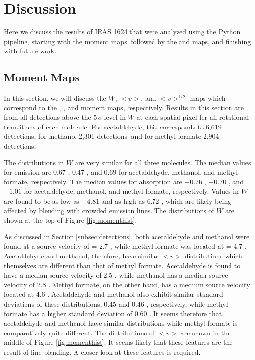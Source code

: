 \documentclass[iop,twocolappendix]{emulateapj}
\begin{document}
\section{Discussion}
\label{sec:discussion}

Here we discuss the results of IRAS 1624 that were analyzed using the Python pipeline, starting with the moment maps, followed by the {\Ntot} and {\Trot} maps, and finishing with future work. 

\subsection{Moment Maps}
\label{subsec:mommaps}

In this section, we will discuss the $W$, $<v>$, and $<v>^{1/2}$ maps which correspond to the {\momzero}, {\momone}, and {\momtwo} moment maps, respectively. Results in this section are from all detections above the 5\,$\sigma$ level in $W$ at each spatial pixel for all rotational transitions of each molecule. For acetaldehyde, this corresponds to 6,619 detections, for methanol 2,301 detections, and for methyl formate 2,904 detections. 

The distributions in $W$ are very similar for all three molecules. The median values for emission are 0.67 {\Jybeamkms}, 0.47 {\Jybeamkms}, and 0.69 {\Jybeamkms} for acetaldehyde, methanol, and methyl formate, respectively. The median values for absorption are $-0.76$ {\Jybeamkms}, $-0.70$ {\Jybeamkms}, and $-1.01$ {\Jybeamkms} for acetaldehyde, methanol, and methyl formate, respectively. Values in $W$ are found to be as low as $-4.81$ {\Jybeamkms} and as high as 6.72 {\Jybeamkms}, which are likely being affected by blending with crowded emission lines. The distributions of $W$ are shown at the top of Figure \ref{fig:momenthist}. 

As discussed in Section \ref{subsec:detections}, both acetaldehyde and methanol were found at a source velocity of {\vLSR} = 2.7 \kms, while methyl formate was located at {\vLSR} = 4.7 \kms. Acetaldehyde and methanol, therefore, have similar $<v>$ distributions which themselves are different than that of methyl formate. Acetaldehyde is found to have a median source velocity of 2.5 \kms, while methanol has a median source velocity of 2.8 \kms. Methyl formate, on the other hand, has a medium source velocity located at 4.6 \kms. Acetaldehyde and methanol also exhibit similar standard deviations of these distributions, 0.45 {\kms} and 0.46 \kms, respectively, while methyl formate has a higher standard deviation of 0.60 \kms. It seems therefore that acetaldehyde and methanol have similar {\vLSR} distributions while methyl formate is comparatively quite different. The distributions of $<v>$ are shown in the middle of Figure \ref{fig:momenthist}. It seems likely that these features are the result of line-blending. A closer look at these features is required.
\end{document}

